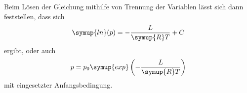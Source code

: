 \noindent Beim Lösen der Gleichung mithilfe von Trennung der Variablen lässt sich dann feststellen, dass sich
\begin{equation*}
    \symup{ln}(p)=-\frac{L}{\symup{R}T}+C
\end{equation*}
ergibt, oder auch
\begin{equation}
    p=p_0 \symup{exp} \left(-\frac{L}{\symup{R}T}\right)
    \label{eqn:druck}
\end{equation}
mit eingesetzter Anfangsbedingung.

\cite{V203}

